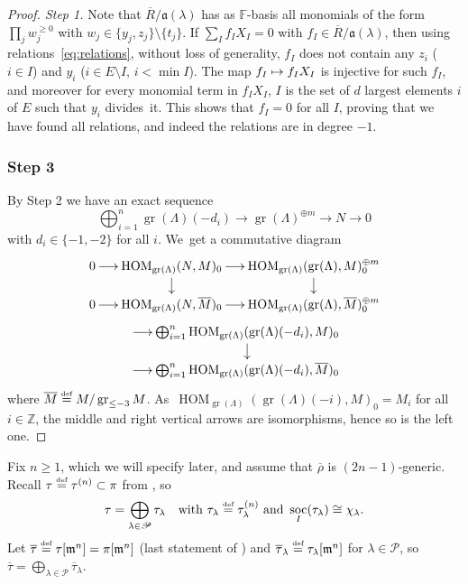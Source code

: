 \documentclass[JEP,XML,SOM,Unicode,NoFloatCountersInSection, NoEqCountersInSection,published]{cedram}
\newcommand\mto{\mathchoice{\longmapsto}{\mapsto}{\mapsto}{\mapsto}}
\let\ovl\overline
\newcommand{\defeq}{\stackrel{\textrm{\tiny{\upshape{def}}}}{=}}
\newcommand{\F}{\mathbb{F}}
\newcommand{\Z}{{\mathbb Z}}
\renewcommand{\P}{\mathscr P}
\newcommand{\brho}{\overline{\rho}}
\DeclareMathOperator{\gr}{gr}
\DeclareMathOperator{\HOM}{HOM}
\DeclareMathOperator{\soc}{soc}
\theoremstyle{plain}
\theoremstyle{definition}
\begin{document}
\begin{proof}[Proof. Step 1]
Note that $\ovl R/\mathfrak{a}(\lambda)$ has as $\F$-basis all monomials of the form $\prod_j w_j^{\ge 0}$ with \hbox{$w_j\!\in\! \{y_j,z_j\}\!\setminus\! \{t_j\}$}.
If $\sum_{I} f_I X_I = 0$ with $f_I \in \ovl R/\mathfrak{a}(\lambda)$, then using relations~\eqref{eq:relations}, without loss of generality, $f_I$ does not contain any $z_i$ ($i \in I$) and $y_i$ ($i \in E \setminus I$, $i < \min I$).
The map $f_I \mto f_I X_I$ is injective for such $f_I$, and moreover for every monomial term in $f_I X_I$, $I$ is the set of $d$ largest elements $i$ of $E$ such that $y_i$ divides~it.
This shows that $f_I = 0$ for all $I$, proving that we have found all relations, and indeed the relations are in degree $-1$.

\subsubsection*{Step 3}
By Step 2 we have an exact sequence\vspace*{-3pt}
\[
\bigoplus_{i=1}^n \gr(\Lambda)(-d_i) \to \gr(\Lambda)^{\oplus m} \to N \to 0
\]
with $d_i \in \{-1,-2\}$ for all $i$. We~get a commutative diagram\vspace*{-3pt}
\begin{multline*}
\xymatrix@R-1pc@C=.5cm{
0 \ar[r] & \HOM_{\gr(\Lambda)}(N,M)_0 \ar[r]\ar[d] & \HOM_{\gr(\Lambda)}(\gr(\Lambda),M)^{\oplus m}_0 \ar[d] \\
0 \ar[r] & \HOM_{\gr(\Lambda)}(N,\ovl M)_0 \ar[r] & \HOM_{\gr(\Lambda)}(\gr(\Lambda),\ovl M)^{\oplus m}_0
}\\
\xymatrix@R-1pc@C=.5cm{
\ar[r]& \bigoplus_{i=1}^n \HOM_{\gr(\Lambda)}(\gr(\Lambda)(-d_i),M)_0 \ar[d]\\
\ar[r] & \bigoplus_{i=1}^n \HOM_{\gr(\Lambda)}(\gr(\Lambda)(-d_i),\ovl M)_0}
\end{multline*}
where $\ovl M \defeq M/\gr_{\le-3} M$. As~$\HOM_{\gr(\Lambda)}(\gr(\Lambda)(-i),M)_0 = M_{i}$ for all $i \in \Z$, the middle and right vertical arrows are isomorphisms, hence so is the left one.
\end{proof}

Fix $n \ge 1$, which we will specify later{, and assume that $\brho$ is $(2n-1)$-generic}.
Recall $\tau \defeq \tau^{(n)} \subset \pi$ from \cite[\S 2.4]{BHHMS4}, so
\[
\tau = \bigoplus_{\lambda \in \P} \tau_\lambda\quad \text{with }\tau_\lambda\defeq \tau_\lambda^{(n)}\text{ and }\soc_I(\tau_\lambda) \cong \chi_\lambda.
\]
Let $\ovl\tau \defeq \tau[\m^{n}]=\pi[\m^{n}]$ (last statement of \cite[Lem.\,2.4.2]{BHHMS4}) and $\ovl\tau_\lambda \defeq \tau_\lambda[\m^{n}]$ for $\lambda \in \P$, so~$\ovl\tau = \bigoplus_{\lambda \in \P} \ovl\tau_\lambda$.
\end{document}
